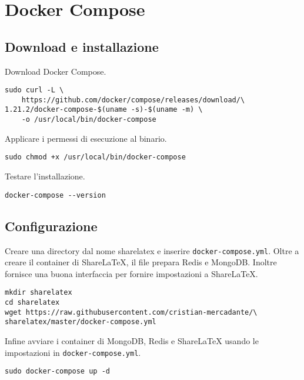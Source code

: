 \section{Docker Compose}
\subsection{Download e installazione}
Download Docker Compose.
\begin{lstlisting}
sudo curl -L \
    https://github.com/docker/compose/releases/download/\
1.21.2/docker-compose-$(uname -s)-$(uname -m) \
    -o /usr/local/bin/docker-compose
\end{lstlisting}
Applicare i permessi di esecuzione al binario.
\begin{lstlisting}
sudo chmod +x /usr/local/bin/docker-compose
\end{lstlisting}
Testare l'installazione.
\begin{lstlisting}
docker-compose --version
\end{lstlisting}

\subsection{Configurazione}
Creare una directory dal nome sharelatex e inserire \verb|docker-compose.yml|. Oltre a creare il container di ShareLaTeX, il file prepara Redis e MongoDB. Inoltre fornisce una buona interfaccia per fornire impostazioni a ShareLaTeX.
\begin{lstlisting}
mkdir sharelatex
cd sharelatex
wget https://raw.githubusercontent.com/cristian-mercadante/\
sharelatex/master/docker-compose.yml
\end{lstlisting}
Infine avviare i container di MongoDB, Redis e ShareLaTeX usando le impostazioni in \verb|docker-compose.yml|.
\begin{lstlisting}
sudo docker-compose up -d
\end{lstlisting}

